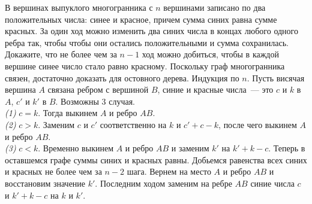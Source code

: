 \problem
В вершинах выпуклого многогранника с $n$ вершинами записано по два
положительных числа: синее и красное, причем сумма синих равна сумме красных.
За один ход можно изменить два синих числа в концах любого одного ребра так,
чтобы чтобы они остались положительными и сумма сохранилась.
Докажите, что не более чем за $n - 1$ ход можно добиться, чтобы в каждой
вершине синее число стало равно красному.
\solution
Поскольку граф многогранника связен, достаточно доказать для остовного дерева.
Индукция по $n$.
Пусть висячая вершина $A$ связана ребром с вершиной $B$,
синие и красные числа~--- это $c$ и $k$ в $A$, $c'$ и $k'$ в $B$.
Возможны 3 случая.
\\
\emph{(1)} $c = k$.
Тогда выкинем $A$ и ребро $AB$.
\\
\emph{(2)} $c > k$.
Заменим $c$ и $c'$ соответственно на $k$ и $c' + c - k$, после чего выкинем
$A$ и ребро $AB$.
\\
\emph{(3)} $c < k$.
Временно выкинем $A$ и ребро $AB$ и заменим $k'$ на $k' + k - c$.
Теперь в оставшемся графе суммы синих и красных равны.
Добьемся равенства всех синих и красных не более чем за $n - 2$ шага.
Вернем на место $A$ и ребро $AB$ и восстановим значение $k'$.
Последним ходом заменим на ребре $AB$ синие числа $c$ и $k' + k - c$ на
$k$ и $k'$.
\endproblem
